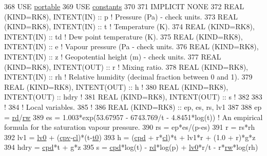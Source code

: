\begin{DoxyCode}
368 \textcolor{keywordtype}{USE }\hyperlink{namespaceportable}{portable}
369 \textcolor{keywordtype}{USE }\hyperlink{namespaceconstants}{constants}
370 
371 \textcolor{keywordtype}{IMPLICIT NONE}
372 \textcolor{keywordtype}{REAL (KIND=RK8)}, \textcolor{keywordtype}{INTENT(IN)}     :: p    \textcolor{comment}{! Pressure (Pa) - check units.}
373 \textcolor{keywordtype}{REAL (KIND=RK8)}, \textcolor{keywordtype}{INTENT(IN)}     :: t    \textcolor{comment}{! Temperature (K).}
374 \textcolor{keywordtype}{REAL (KIND=RK8)}, \textcolor{keywordtype}{INTENT(IN)}     :: td   \textcolor{comment}{! Dew point temperature (K).}
375 \textcolor{keywordtype}{REAL (KIND=RK8)}, \textcolor{keywordtype}{INTENT(IN)}     :: e    \textcolor{comment}{! Vapour pressure (Pa - check units.}
376 \textcolor{keywordtype}{REAL (KIND=RK8)}, \textcolor{keywordtype}{INTENT(IN)}     :: z    \textcolor{comment}{! Geopotential height (m) - check units.}
377 \textcolor{keywordtype}{REAL (KIND=RK8)}, \textcolor{keywordtype}{INTENT(OUT)}    :: r    \textcolor{comment}{! Mixing ratio.}
378 \textcolor{keywordtype}{REAL (KIND=RK8)}, \textcolor{keywordtype}{INTENT(IN)}     :: rh   \textcolor{comment}{! Relative humidity (decimal fraction between 0 and 1). }
379 \textcolor{keywordtype}{REAL (KIND=RK8)}, \textcolor{keywordtype}{INTENT(OUT)}    :: h    \textcolor{comment}{!}
380 \textcolor{keywordtype}{REAL (KIND=RK8)}, \textcolor{keywordtype}{INTENT(OUT)}    :: hdry \textcolor{comment}{!}
381 \textcolor{keywordtype}{REAL (KIND=RK8)}, \textcolor{keywordtype}{INTENT(OUT)}    :: s    \textcolor{comment}{!}
382 
383 \textcolor{comment}{!}
384 \textcolor{comment}{! Local variables.}
385 \textcolor{comment}{!}
386 \textcolor{keywordtype}{REAL (KIND=RK8)}                 :: ep, es, rs, lv1
387 
388 ep      = \hyperlink{namespaceconstants_ad91564da82b97ea0d29ce0565565db85}{rd}/\hyperlink{namespaceconstants_a7ef8fc37397fbfbefd3c22883378dcc5}{rw}
389 es      = 1.003*exp(53.67957 - 6743.769/t - 4.8451*log(t))  \textcolor{comment}{! An empirical formula for the saturation
       vapour pressure.}
390 rs      = ep*es/(p-es)
391 r       = rs*rh
392 lv1     = \hyperlink{namespaceconstants_afb3befdfd57058ee9d073b832134a601}{lv0} + (\hyperlink{namespaceconstants_afc5ea9cd5f9cf3a42e750ba5ab73c967}{cpv}-\hyperlink{namespaceconstants_a4f2911e99beba65b9371b9a80d7c08d0}{cl})*(t-\hyperlink{namespaceconstants_a753fbbdd5d5b4af00d6819cb78ba99a1}{t0})
393 h       = (\hyperlink{namespaceconstants_a32354adf3493f59d0fc17b0302b2c368}{cpd} + r*\hyperlink{namespaceconstants_a4f2911e99beba65b9371b9a80d7c08d0}{cl})*t + lv1*r + (1.0 + r)*\hyperlink{namespaceconstants_a046aef138fbc8d05251d4fdc6eb3ee89}{g}*z
394 hdry    = \hyperlink{namespaceconstants_a32354adf3493f59d0fc17b0302b2c368}{cpd}*t + \hyperlink{namespaceconstants_a046aef138fbc8d05251d4fdc6eb3ee89}{g}*z
395 s       = \hyperlink{namespaceconstants_a32354adf3493f59d0fc17b0302b2c368}{cpd}*log(t) - \hyperlink{namespaceconstants_ad91564da82b97ea0d29ce0565565db85}{rd}*log(p) + \hyperlink{namespaceconstants_afb3befdfd57058ee9d073b832134a601}{lv0}*r/t - r*\hyperlink{namespaceconstants_a7ef8fc37397fbfbefd3c22883378dcc5}{rw}*log(rh)
\end{DoxyCode}


